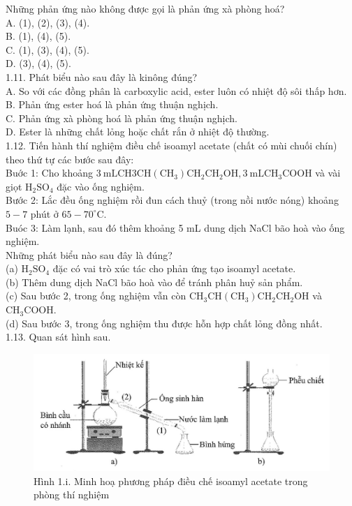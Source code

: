 \documentclass[10pt]{article}
\begin{document}
Những phản ứng nào không được gọi là phản ứng xà phòng hoá?\\
A. (1), (2), (3), (4).\\
B. (1), (4), (5).\\
C. (1), (3), (4), (5).\\
D. (3), (4), (5).\\
1.11. Phát biểu nào sau đây là kinông đúng?\\
A. So với các đồng phân là carboxylic acid, ester luôn có nhiệt độ sôi thấp hơn.\\
B. Phản ứng ester hoá là phản ứng thuận nghịch.\\
C. Phản ứng xà phòng hoá là phản ứng thuận nghịch.\\
D. Ester là những chất lỏng hoặc chất rắn ở nhiệt độ thường.\\
1.12. Tiến hành thí nghiệm điều chế isoamyl acetate (chất có mùi chuối chín) theo thứ tự các bước sau đây:\\
Buớc 1: Cho khoảng $3 \mathrm{~mL} \mathrm{CH} 3 \mathrm{CH}\left(\mathrm{CH}_{3}\right) \mathrm{CH}_{2} \mathrm{CH}_{2} \mathrm{OH}, 3 \mathrm{~mL} \mathrm{CH}_{3} \mathrm{COOH}$ và vài giọt $\mathrm{H}_{2} \mathrm{SO}_{4}$ đặc vào ống nghiệm.\\
Bước 2: Lắc đều ống nghiệm rồi đun cách thuỷ (trong nồi nước nóng) khoảng $5-7$ phút ở $65-70^{\circ} \mathrm{C}$.\\
Buóc 3: Làm lạnh, sau đó thêm khoảng 5 mL dung dịch NaCl bão hoà vào ống nghiệm.\\
Những phát biểu nào sau đây là đúng?\\
(a) $\mathrm{H}_{2} \mathrm{SO}_{4}$ đặc có vai trò xúc tác cho phản ứng tạo isoamyl acetate.\\
(b) Thêm dung dịch NaCl bão hoà vào để tránh phân huỷ sản phẩm.\\
(c) Sau bước 2, trong ống nghiệm vẫn còn $\mathrm{CH}_{3} \mathrm{CH}\left(\mathrm{CH}_{3}\right) \mathrm{CH}_{2} \mathrm{CH}_{2} \mathrm{OH}$ và $\mathrm{CH}_{3} \mathrm{COOH}$.\\
(d) Sau bước 3, trong ống nghiệm thu được hỗn hợp chất lỏng đồng nhất.\\
1.13. Quan sát hình sau.

\begin{figure}[h]
\begin{center}
  \includegraphics[width=\textwidth]{2025_10_23_80c1361fcdcd395cad8eg-03}
\captionsetup{labelformat=empty}
\caption{Hình 1.i. Minh hoạ phương pháp điều chế isoamyl acetate trong phòng thí nghiệm}
\end{center}
\end{figure}
\end{document}
